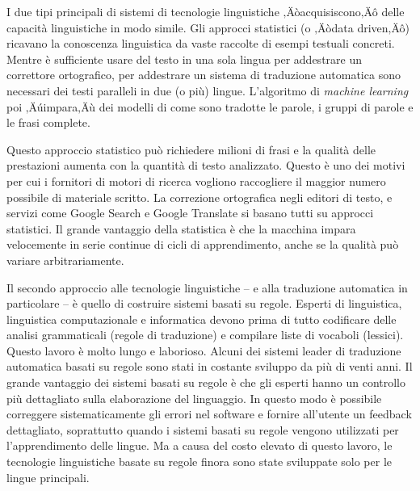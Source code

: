 \begin{multicols}{2}

I due tipi principali di sistemi di tecnologie linguistiche ‚Äòacquisiscono‚Äô delle capacit\`{a} linguistiche in modo simile. Gli approcci statistici (o ‚Äòdata driven‚Äô) ricavano la conoscenza linguistica da vaste raccolte di esempi testuali concreti. Mentre \`{e} sufficiente usare del testo in una sola lingua per addestrare un correttore ortografico, per addestrare un sistema di traduzione automatica sono necessari dei testi paralleli in due (o pi\`{u}) lingue. L'algoritmo di \textit{machine learning} poi ‚Äúimpara‚Äù dei modelli di come sono tradotte le parole, i gruppi di parole e le frasi complete.

Questo approccio statistico pu\`{o} richiedere milioni di frasi e la
qualit\`{a} delle prestazioni aumenta con la quantit\`{a} di testo
analizzato. Questo \`{e} uno dei motivi per cui i fornitori di motori di
ricerca vogliono raccogliere il maggior numero possibile di materiale
scritto. La correzione ortografica negli editori di testo, e servizi come
Google Search e Google Translate si basano tutti su approcci
statistici. Il grande vantaggio della statistica \`{e} che la macchina impara
velocemente in serie continue di cicli di apprendimento, anche se la
qualit\`{a} pu\`{o} variare arbitrariamente.

Il secondo approccio alle tecnologie linguistiche -- e alla traduzione
automatica in particolare -- \`{e} quello di costruire sistemi basati su
regole. Esperti di linguistica, linguistica computazionale e informatica
devono prima di tutto codificare delle analisi grammaticali (regole di
traduzione) e compilare liste di vocaboli (lessici). Questo lavoro \`{e} molto
lungo e laborioso. Alcuni dei sistemi leader di traduzione automatica basati
su regole sono stati in costante sviluppo da pi\`{u} di venti anni. Il grande
vantaggio dei sistemi basati su regole \`{e} che gli esperti hanno un controllo
pi\`{u} dettagliato sulla elaborazione del linguaggio. In questo modo \`{e}
possibile correggere sistematicamente gli errori nel software e fornire
all'utente un feedback dettagliato, soprattutto quando i sistemi basati su
regole vengono utilizzati per l'apprendimento delle lingue. Ma a causa del
costo elevato di questo lavoro, le tecnologie linguistiche basate su regole
finora sono state sviluppate solo per le lingue principali.


\end{multicols}

